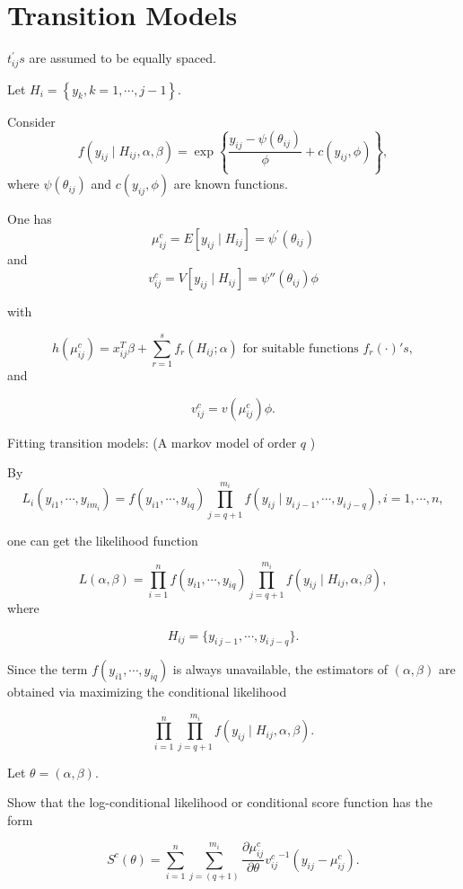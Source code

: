 \documentclass[UTF8,a4paper,10pt]{article}
\begin{document}





\section*{Transition Models}

$t_{ij}^{\prime} s$ are assumed to be equally spaced.


Let $H_i=\left\{y_k, k=1, \cdots, j-1\right\}$. 

Consider \[f(y_{ij}\mid H_{ij},\alpha,\beta) = \exp\left\{\frac{y_{ij}-\psi(\theta_{ij})}{\phi}+c(y_{ij},\phi)\right\},\] where \(\psi(\theta_{ij})\) and \(c(y_{ij},\phi)\) are known functions. 

One has 
$$\mu_{ij}^c=E\left[y_{ij} \mid H_{ij}\right]=\psi^{\prime}\left(\theta_{ij}\right)$$ 
and 
$$v_{ij}^c=V\left[y_{ij} \mid H_{ij}\right]=\psi''\left(\theta_{ij}\right) \phi$$ 

with

\[h(\mu_{ij}^c) = x_{ij}^T\beta +\sum_{r=1}^{s}f_r(H_{ij};\alpha)\text{ for suitable functions }f_r(\cdot)'s,\]
and

\[v_{ij}^c = v(\mu_{ij}^c)\phi.\]


\begin{Problem}[]{Fitting transition models: (A markov model of order $q$ )}


By
\[L_i(y_{i1},\cdots,y_{im_i}) = f(y_{i1},\cdots,y_{iq})\prod_{j=q+1}^{m_i}f(y_{ij}\mid y_{i\, j-1},\cdots,y_{i \, j-q}), i = 1,\cdots,n,\]

one can get the likelihood function 

\[L(\alpha,\beta) = \prod_{i=1}^{n}f(y_{i1},\cdots,y_{iq})\prod_{j=q+1}^{m_i}f(y_{ij}\mid H_{ij},\alpha,\beta),\]
where 

\[H_{ij} = \{y_{i \, j-1},\cdots,y_{i \, j-q}\}.\]

Since the term $f\left(y_{i1}, \cdots, y_{iq}\right)$ is always unavailable, the estimators of $(\alpha, \beta)$ are obtained via maximizing the conditional likelihood 

$$\prod_{i=1}^{n} \prod_{j=q+1}^{m_i} f\left(y_{ij}\mid H_{ij}, \alpha, \beta\right).$$

Let $\theta=(\alpha, \beta)$.

Show that the log-conditional likelihood or conditional score function has the form

\[S^c(\theta) = \sum_{i=1}^{n}\sum_{j = (q+1)}^{m_i}\frac{\partial \mu_{ij}^c}{\partial \theta}{v_{ij}^c}^{-1}(y_{ij}-\mu_{ij}^c).\]

\end{Problem}
\end{document}
